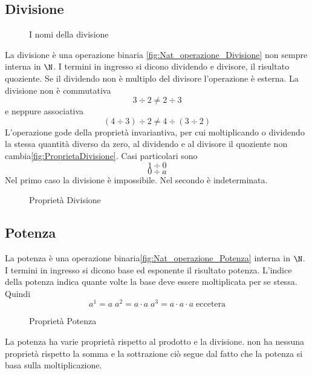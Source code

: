 \subsection{Divisione}
\label{sec:Numerinatdiv}
\begin{figure} %
	\centering

	\caption{I nomi della divisione}
	\label{fig:ProprietaDivisione}
	\end{figure}
La divisione è una operazione binaria \nobs\vref{fig:Nat_operazione_Divisione} non sempre interna in $\N$. I termini in ingresso si dicono dividendo e divisore, il risultato quoziente. Se il dividendo non è  multiplo  del divisore l'operazione è esterna. La divisione non è commutativa \[3\div2\neq2\div3\] e neppure associativa \[(4\div3)\div2\neq4\div(3\div2)\] L'operazione gode della proprietà invariantiva, per cui moltiplicando  o dividendo la stessa quantità diverso da zero, al dividendo e al divisore il quoziente non cambia\nobs\vref{fig:ProprietaDivisione}. Casi particolari sono \[1\div0\] \[0\div a\] Nel primo caso la divisione è impossibile. Nel secondo è indeterminata.
\begin{figure} %
	\centering

	\caption{Proprietà Divisione}
		\label{fig:ProprietaDivisione2}
	\end{figure}
\subsection{Potenza}
\label{sec:NumerinatPot}

La potenza è una operazione binaria\nobs\vref{fig:Nat_operazione_Potenza}  interna in $\N$. I termini in ingresso si dicono base ed esponente il risultato potenza. L'indice della potenza indica quante volte la base deve essere moltiplicata per se stessa. Quindi\[a^1=a\; a^2=a\cdot a\; a^3=a\cdot a\cdot a\; \text{eccetera} \] 
\begin{figure} %
	\centering
	
	\caption{Proprietà Potenza}
	\label{fig:ProprietaPotenza}\end{figure}
\restoregeometry
La potenza ha varie proprietà rispetto al prodotto e la divisione. non ha nessuna proprietà rispetto la somma e la sottrazione ciò segue dal fatto che la potenza si basa sulla moltiplicazione. 

